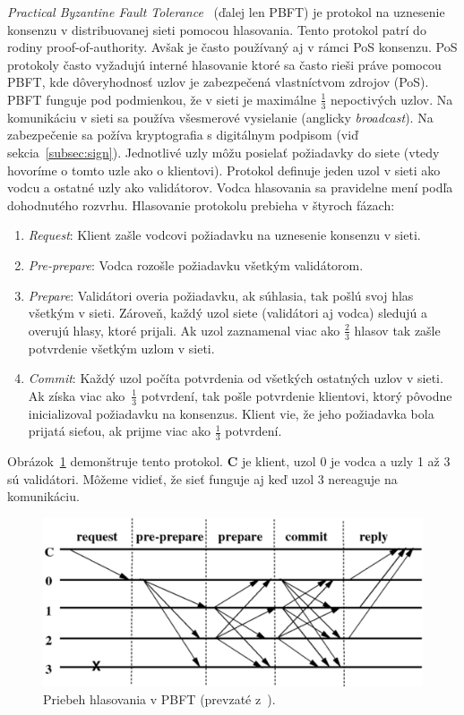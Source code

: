 \textit{Practical Byzantine Fault Tolerance}~\cite{pbftCastro} (ďalej len PBFT) je protokol na uznesenie konsenzu v distribuovanej sieti pomocou hlasovania. Tento protokol patrí do rodiny proof-of-authority. Avšak je často používaný aj v rámci PoS konsenzu. PoS protokoly často vyžadujú interné hlasovanie ktoré sa často rieši práve pomocou PBFT, kde dôveryhodnosť uzlov je zabezpečená vlastníctvom zdrojov (PoS). PBFT funguje pod podmienkou, že v sieti je maximálne $\frac{1}{3}$ nepoctivých uzlov. Na komunikáciu v sieti sa používa všesmerové vysielanie (anglicky \textit{broadcast}). Na zabezpečenie sa požíva kryptografia s digitálnym podpisom (viď sekcia~\ref{subsec:sign}). Jednotlivé uzly môžu posielať požiadavky do siete (vtedy hovoríme o tomto uzle ako o klientovi). Protokol definuje jeden uzol v sieti ako vodcu a ostatné uzly ako validátorov. Vodca hlasovania sa pravidelne mení podľa dohodnutého rozvrhu.
Hlasovanie protokolu prebieha v štyroch fázach:
\begin{enumerate}
	\item \textit{Request}: Klient zašle vodcovi požiadavku na uznesenie konsenzu v sieti.
	\item \textit{Pre-prepare}: Vodca rozošle požiadavku všetkým validátorom.
	\item \textit{Prepare}: Validátori overia požiadavku, ak súhlasia, tak pošlú svoj hlas všetkým v sieti. Zároveň, každý uzol siete (validátori aj vodca) sledujú a overujú hlasy, ktoré prijali. Ak uzol zaznamenal viac ako $\frac{2}{3}$ hlasov tak zašle potvrdenie všetkým uzlom v sieti. 
	\item \textit{Commit}: Každý uzol počíta potvrdenia od všetkých ostatných uzlov v sieti. Ak získa viac ako~$\frac{1}{3}$ potvrdení, tak pošle potvrdenie klientovi, ktorý pôvodne inicializoval požiadavku na konsenzus. Klient vie, že jeho požiadavka bola prijatá sieťou, ak prijme viac ako $\frac{1}{3}$ potvrdení.
\end{enumerate}
Obrázok~\ref{img:pbft} demonštruje tento protokol. \textbf{C} je klient, uzol 0 je vodca a uzly 1 až 3 sú validátori. Môžeme vidieť, že sieť funguje aj keď uzol 3 nereaguje na komunikáciu.
\begin{figure}[bt]
	\centering
	\includegraphics[width=.7\textwidth]{obrazky-figures/pbft}
	\caption{Priebeh hlasovania v PBFT (prevzaté z~\cite{pbftCastro}).}
	\label{img:pbft}
\end{figure}

